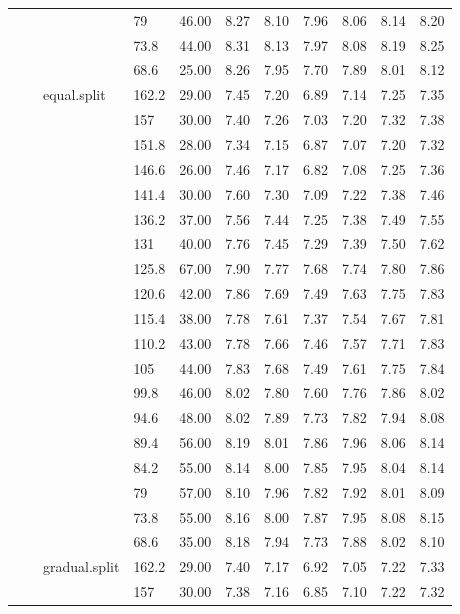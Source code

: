 \begin{longtable}{llllrrrrrrr}
   &  &  & 79 & 46.00 & 8.27 & 8.10 & 7.96 & 8.06 & 8.14 & 8.20 \\ 
   &  &  & 73.8 & 44.00 & 8.31 & 8.13 & 7.97 & 8.08 & 8.19 & 8.25 \\ 
   &  &  & 68.6 & 25.00 & 8.26 & 7.95 & 7.70 & 7.89 & 8.01 & 8.12 \\ 
   &  & equal.split & 162.2 & 29.00 & 7.45 & 7.20 & 6.89 & 7.14 & 7.25 & 7.35 \\ 
   &  &  & 157 & 30.00 & 7.40 & 7.26 & 7.03 & 7.20 & 7.32 & 7.38 \\ 
   &  &  & 151.8 & 28.00 & 7.34 & 7.15 & 6.87 & 7.07 & 7.20 & 7.32 \\ 
   &  &  & 146.6 & 26.00 & 7.46 & 7.17 & 6.82 & 7.08 & 7.25 & 7.36 \\ 
   &  &  & 141.4 & 30.00 & 7.60 & 7.30 & 7.09 & 7.22 & 7.38 & 7.46 \\ 
   &  &  & 136.2 & 37.00 & 7.56 & 7.44 & 7.25 & 7.38 & 7.49 & 7.55 \\ 
   &  &  & 131 & 40.00 & 7.76 & 7.45 & 7.29 & 7.39 & 7.50 & 7.62 \\ 
   &  &  & 125.8 & 67.00 & 7.90 & 7.77 & 7.68 & 7.74 & 7.80 & 7.86 \\ 
   &  &  & 120.6 & 42.00 & 7.86 & 7.69 & 7.49 & 7.63 & 7.75 & 7.83 \\ 
   &  &  & 115.4 & 38.00 & 7.78 & 7.61 & 7.37 & 7.54 & 7.67 & 7.81 \\ 
   &  &  & 110.2 & 43.00 & 7.78 & 7.66 & 7.46 & 7.57 & 7.71 & 7.83 \\ 
   &  &  & 105 & 44.00 & 7.83 & 7.68 & 7.49 & 7.61 & 7.75 & 7.84 \\ 
   &  &  & 99.8 & 46.00 & 8.02 & 7.80 & 7.60 & 7.76 & 7.86 & 8.02 \\ 
   &  &  & 94.6 & 48.00 & 8.02 & 7.89 & 7.73 & 7.82 & 7.94 & 8.08 \\ 
   &  &  & 89.4 & 56.00 & 8.19 & 8.01 & 7.86 & 7.96 & 8.06 & 8.14 \\ 
   &  &  & 84.2 & 55.00 & 8.14 & 8.00 & 7.85 & 7.95 & 8.04 & 8.14 \\ 
   &  &  & 79 & 57.00 & 8.10 & 7.96 & 7.82 & 7.92 & 8.01 & 8.09 \\ 
   &  &  & 73.8 & 55.00 & 8.16 & 8.00 & 7.87 & 7.95 & 8.08 & 8.15 \\ 
   &  &  & 68.6 & 35.00 & 8.18 & 7.94 & 7.73 & 7.88 & 8.02 & 8.10 \\ 
   &  & gradual.split & 162.2 & 29.00 & 7.40 & 7.17 & 6.92 & 7.05 & 7.22 & 7.33 \\ 
   &  &  & 157 & 30.00 & 7.38 & 7.16 & 6.85 & 7.10 & 7.22 & 7.32 \\ 

\end{longtable}
